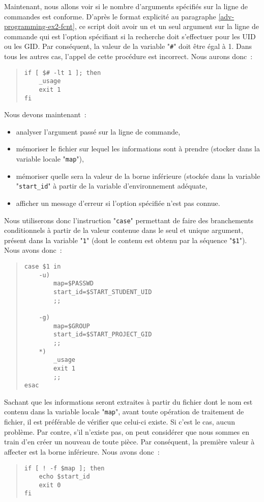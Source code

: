 Maintenant, nous allons voir si le nombre d'arguments sp{\'e}cifi{\'e}s sur la ligne de
commandes est conforme. D'apr{\`e}s le format explicit{\'e} au paragraphe
\ref{adv-programming-ex2-fcnt}, ce script doit avoir un et un seul argument
sur la ligne de commande qui est l'option sp{\'e}cifiant si la recherche
doit s'effectuer pour les UID ou les GID. Par cons{\'e}quent, la valeur
de la variable "\verb=#=" doit {\^e}tre {\'e}gal {\`a} 1. Dans tous les autres
cas, l'appel de cette proc{\'e}dure est incorrect. Nous aurons donc~:
\begin{quote}
\begin{verbatim}
if [ $# -lt 1 ]; then
    _usage
    exit 1
fi
\end{verbatim}
\end{quote}

Nous devons maintenant~:
\begin{itemize}
	\item	analyser l'argument pass{\'e} sur la ligne de commande,
	\item	m{\'e}moriser le fichier sur lequel les informations sont {\`a} prendre
			(stocker dans la variable locale "{\tt map}"),
	\item	m{\'e}moriser quelle sera la valeur de la borne inf{\'e}rieure (stock{\'e}e
			dans la variable "{\tt start\_id}" {\`a} partir de la variable
			d'environnement ad{\'e}quate,
	\item	afficher un message d'erreur si l'option sp{\'e}cifi{\'e}e n'est pas
			connue.
\end{itemize}
Nous utiliserons donc l'instruction "{\tt case}" permettant de faire
des branchements conditionnels {\`a} partir de la valeur contenue dans
le seul et unique argument, pr{\'e}sent dans la variable "{\tt 1}" (dont le
contenu est obtenu par la s{\'e}quence "\verb=$1="). Nous avons donc~:
\begin{quote}
\begin{verbatim}
case $1 in
    -u)
        map=$PASSWD
        start_id=$START_STUDENT_UID
        ;;

    -g)
        map=$GROUP
        start_id=$START_PROJECT_GID
        ;;
    *)
        _usage
        exit 1
        ;;
esac
\end{verbatim}
\end{quote}

Sachant que les informations seront extraites {\`a} partir du fichier dont le
nom est contenu dans la variable locale "{\tt map}", avant toute op{\'e}ration
de traitement de fichier, il est pr{\'e}f{\'e}rable de v{\'e}rifier que celui-ci existe.
Si c'est le cas, aucun probl{\`e}me. Par contre, s'il n'existe pas, on peut consid{\'e}rer
que nous sommes en train d'en cr{\'e}er un nouveau de toute pi{\`e}ce. Par cons{\'e}quent,
la premi{\`e}re valeur {\`a} affecter est la borne inf{\'e}rieure. Nous avons donc~:
\begin{quote}
\begin{verbatim}
if [ ! -f $map ]; then
    echo $start_id
    exit 0
fi
\end{verbatim}
\end{quote}

